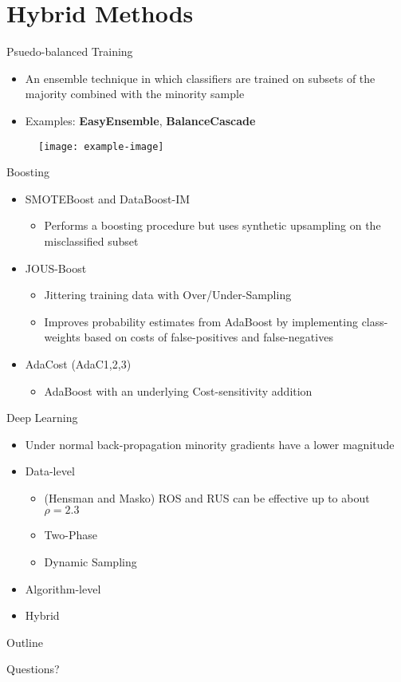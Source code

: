 \documentclass[xcolor={dvipsnames}]{beamer}
\begin{document}
\section{Hybrid Methods}
\begin{frame}{Psuedo-balanced Training}
	\begin{itemize}
		\item An ensemble technique in which classifiers are trained on subsets of the majority combined with the minority sample
		\item Examples: \textbf{EasyEnsemble}, \textbf{BalanceCascade}
	\end{itemize}
	\begin{figure}
		\centering
		\texttt{[image: example-image]}
	\end{figure}
\end{frame}
\begin{frame}{Boosting}
	\begin{itemize}
		\item SMOTEBoost and DataBoost-IM
		\begin{itemize}
			\item Performs a boosting procedure but uses synthetic upsampling on the misclassified subset
		\end{itemize}
		\item JOUS-Boost
		\begin{itemize}
			\item Jittering training data with Over/Under-Sampling
			\item Improves probability estimates from AdaBoost by implementing class-weights based on costs of false-positives and false-negatives
		\end{itemize}
		\item AdaCost (AdaC1,2,3)
		\begin{itemize}
			\item AdaBoost with an underlying Cost-sensitivity addition
		\end{itemize}
	\end{itemize}
\end{frame}

\begin{frame}{Deep Learning}
	
	\begin{itemize}
		\item Under normal back-propagation minority gradients have a lower magnitude
		\item Data-level 
		\begin{itemize}
			\item (Hensman and Masko) ROS and RUS can be effective up to about $\rho=2.3$
			\item Two-Phase
			\item Dynamic Sampling
		\end{itemize}
		\item Algorithm-level
		\item Hybrid
	\end{itemize}
\end{frame}

\begin{frame}{Outline}
	\tableofcontents
\end{frame}
\begin{frame}{}
	\begin{center}
		\Large Questions?
	\end{center}
\end{frame}
\end{document}
